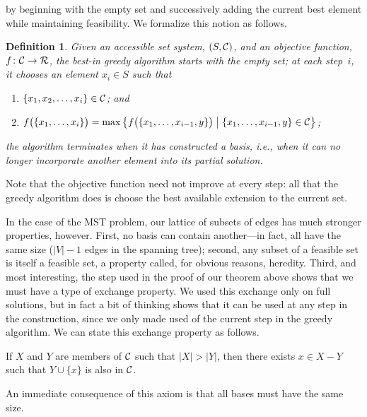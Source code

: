 \documentclass[11pt]{article}
\newtheorem{definition}{Definition}
\begin{document}
by beginning with the empty set and successively adding the current best
element while maintaining feasibility.  We formalize this notion as follows.
\begin{definition}
  Given an accessible set system, $(S,{\cal C})$, and an objective function,
  $f\colon{\cal C}\to{\cal R}$, the
  \emph{best-in greedy algorithm} starts with the empty set;
  at each step~$i$, it chooses an element $x_i\in S$ such that
  \begin{enumerate}
    \itemsep 0pt
    \item
      $\{x_1 , x_2 , \ldots , x_i\} \in {\cal C}$; and
    \item
      $f\bigl(\{x_1,\ldots,x_i\}\bigr) = \max\left\{ f\bigl(\{x_1,\ldots,x_{i-1}
,y\}\bigr) \bigm| \{x_1,\ldots,x_{i-1},y\} \in {\cal C} \right\}$;
  \end{enumerate}
  the algorithm terminates when it has constructed a basis, i.e., when it
  can no longer incorporate another element into its partial solution.
\end{definition}
Note that the objective function need not improve at every step: all that
the greedy algorithm does is choose the best available extension to the
current set.

In the case of the MST problem, our lattice of subsets of edges has
much stronger properties, however.  First, no basis can contain another---in fact, all have the same size ($|V|-1$ edges in the spanning tree); second, any
subset of a feasible set is itself a feasible set, a property called,
for obvious reasons, heredity.  Third, and most interesting, the step used
in the proof of our theorem above shows that we must have a type of exchange
property.  We used this exchange only on full solutions, but in fact a bit
of thinking shows that it can be used at any step in the construction,
since we only made used of the current step in the greedy algorithm.
We can state this exchange property as follows.
\begin{description}
  \itemsep 0pt
  \item[\it (exchange axiom)]
    If $X$ and $Y$ are members of ${\cal C}$ such that $|X| > |Y|$,
    then there exists $x \in X-Y$ such that $Y\cup \{x\}$ is also in ${\cal C}$.
\end{description}
An immediate consequence of this axiom is that all bases must have
the same size.
\end{document}
